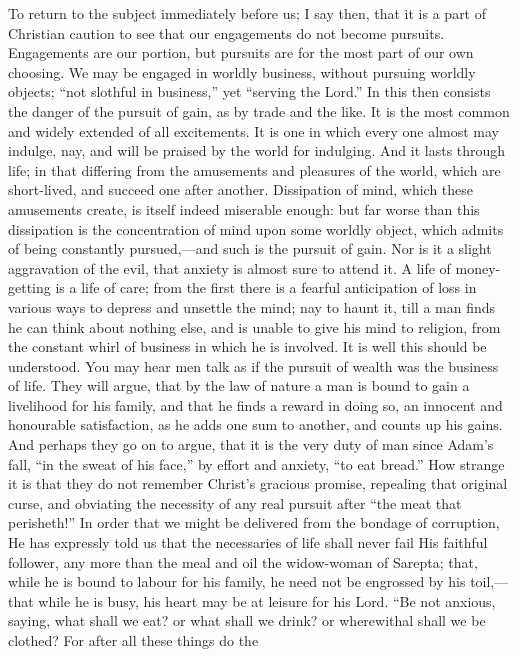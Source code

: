 To return to the subject immediately before us; I say then, that it
is a part of Christian caution to see that our engagements do not become
pursuits. Engagements are our portion, but pursuits are for the most
part of our own choosing. We may be engaged in worldly business, without
pursuing worldly objects; ``not slothful in business,'' yet
``serving the Lord.'' In this then consists the danger of the
pursuit of gain, as by trade and the like. It is the most common and
widely extended of all excitements. It is one in which every one almost
may indulge, nay, and will be praised by the world for indulging. And it
lasts through life; in that differing from the amusements and pleasures
of the world, which are short-lived, and succeed one after another.
Dissipation of mind, which these amusements create, is itself indeed
miserable enough: but far worse than this dissipation is the
concentration of mind upon some worldly object, which admits of being
constantly pursued,—and such is the pursuit of gain. Nor is it a slight
aggravation of the evil, that anxiety is almost sure to attend it. A
life of money-getting is a life of care; from the first there is a
fearful anticipation of loss in various ways to depress and unsettle the
mind; nay to haunt it, till a man finds he can think about nothing else,
and is unable to give his mind to religion, from the constant whirl of
business in which he is involved. It is well this should be understood.
You may hear men talk as if the pursuit of wealth was the business of
life. They will argue, that by the law of nature a man is bound to gain
a livelihood for his family, and that he finds a reward in doing so, an
innocent and honourable satisfaction, as he adds one sum to another, and
counts up his gains. And perhaps they go on to argue, that it is the
very duty of man since Adam's fall, ``in the sweat of his
face,'' by effort and anxiety, ``to eat bread.'' How strange
it is that they do not remember Christ's gracious promise, repealing
that original curse, and obviating the necessity of any real pursuit
after ``the meat that perisheth!'' In order that we might be
delivered from the bondage of corruption, He has expressly told us that
the necessaries of life shall never fail His faithful follower, any more
than the meal and oil the widow-woman of Sarepta; that, while he is
bound to labour for his family, he need not be engrossed by his toil,—that while he is busy, his heart may be at leisure for his Lord.
``Be not anxious, saying, what shall we eat? or what shall we drink?
or wherewithal shall we be clothed? For after all these things do the
